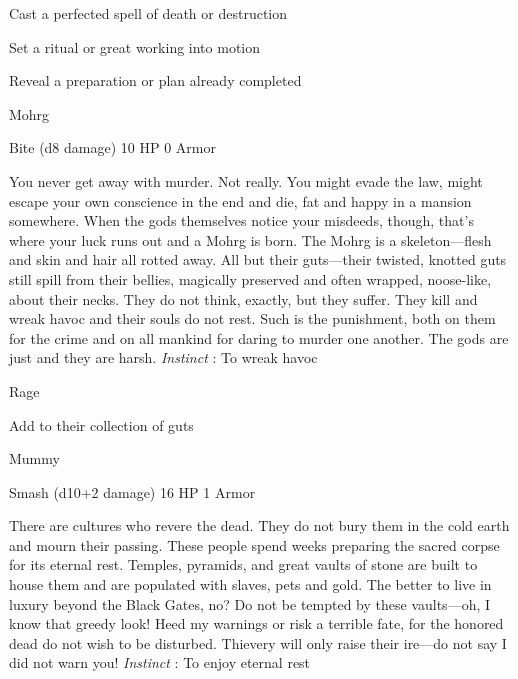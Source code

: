 \startitemize[1,packed]

\item Cast a perfected spell of death or destruction

 
\item Set a ritual or great working into motion

 
\item Reveal a preparation or plan already completed


\stopitemize
 
\startMonsterName
Mohrg	 
\stopMonsterName
 

Bite (d8 damage)	10 HP	0 Armor

 


 
\startMonsterDescription
You never get away with murder.  Not really.  You might evade the law, might escape your own conscience in the end and die, fat and happy in a mansion somewhere.  When the gods themselves notice your misdeeds, though, that’s where your luck runs out and a Mohrg is born.  The Mohrg is a skeleton—flesh and skin and hair all rotted away.  All but their guts—their twisted, knotted guts still spill from their bellies, magically preserved and often wrapped, noose-like, about their necks.  They do not think, exactly, but they suffer.  They kill and wreak havoc and their souls do not rest.  Such is the punishment, both on them for the crime and on all mankind for daring to murder one another.  The gods are just and they are harsh. {\em Instinct} : To wreak havoc
\stopMonsterDescription
 
\startitemize[1,packed]

\item Rage

 
\item Add to their collection of guts


\stopitemize
 
\startMonsterName
Mummy	 
\stopMonsterName
 

Smash (d10+2 damage)	16 HP	1 Armor

 


 
\startMonsterDescription
There are cultures who revere the dead.  They do not bury them in the cold earth and mourn their passing. These people spend weeks preparing the sacred corpse for its eternal rest.  Temples, pyramids, and great vaults of stone are built to house them and are populated with slaves, pets and gold.  The better to live in luxury beyond the Black Gates, no?  Do not be tempted by these vaults—oh, I know that greedy look!  Heed my warnings or risk a terrible fate, for the honored dead do not wish to be disturbed.  Thievery will only raise their ire—do not say I did not warn you! {\em Instinct} : To enjoy eternal rest
\stopMonsterDescription
 
